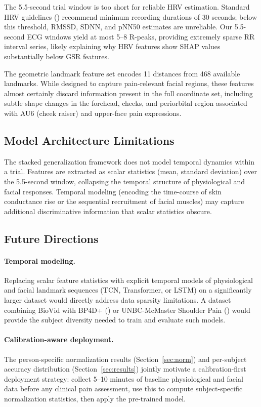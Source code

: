 \documentclass[10pt, twocolumn]{article}
\begin{document}
The 5.5-second trial window is too short for reliable HRV estimation. Standard HRV
guidelines (\cite{Task1996}) recommend minimum recording durations of 30 seconds; below
this threshold, RMSSD, SDNN, and pNN50 estimates are unreliable. Our 5.5-second ECG
windows yield at most 5--8 R-peaks, providing extremely sparse RR interval series,
likely explaining why HRV features show SHAP values substantially below GSR features.

The geometric landmark feature set encodes 11 distances from 468 available landmarks.
While designed to capture pain-relevant facial regions, these features almost certainly
discard information present in the full coordinate set, including subtle shape changes in
the forehead, cheeks, and periorbital region associated with AU6 (cheek raiser) and
upper-face pain expressions.

\subsection{Model Architecture Limitations}

The stacked generalization framework does not model temporal dynamics within a trial.
Features are extracted as scalar statistics (mean, standard deviation) over the 5.5-second
window, collapsing the temporal structure of physiological and facial responses. Temporal
modeling (encoding the time-course of skin conductance rise or the sequential recruitment
of facial muscles) may capture additional discriminative information that scalar statistics
obscure.

\subsection{Future Directions}

\paragraph{Temporal modeling.}
Replacing scalar feature statistics with explicit temporal models of physiological and
facial landmark sequences (TCN, Transformer, or LSTM) on a significantly larger dataset
would directly address data sparsity limitations. A dataset combining BioVid with BP4D+
(\cite{Zhang2016}) or UNBC-McMaster Shoulder Pain (\cite{Lucey2011}) would provide the
subject diversity needed to train and evaluate such models.

\paragraph{Calibration-aware deployment.}
The person-specific normalization results (Section~\ref{sec:norm}) and per-subject accuracy
distribution (Section~\ref{sec:results}) jointly motivate a calibration-first deployment
strategy: collect 5--10 minutes of baseline physiological and facial data before any
clinical pain assessment, use this to compute subject-specific normalization statistics,
then apply the pre-trained model.
\end{document}
